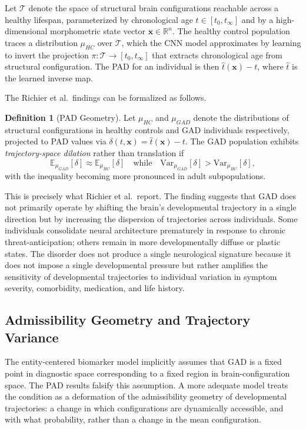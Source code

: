 \documentclass[11pt,a4paper]{article}
\theoremstyle{plain}
\theoremstyle{definition}
\newtheorem{definition}[theorem]{Definition}
\begin{document}
Let $\mathcal{T}$ denote the space of structural brain configurations reachable across
a healthy lifespan, parameterized by chronological age $t \in [t_0, t_\infty]$ and
by a high-dimensional morphometric state vector $\mathbf{x} \in \mathbb{R}^n$.
The healthy control population traces a distribution $\mu_{HC}$ over $\mathcal{T}$,
which the CNN model approximates by learning to invert the projection
$\pi: \mathcal{T} \to [t_0, t_\infty]$ that extracts chronological age from structural
configuration. The PAD for an individual is then $\hat{t}(\mathbf{x}) - t$,
where $\hat{t}$ is the learned inverse map.

The Richier et al.\ findings can be formalized as follows.

\begin{definition}[PAD Geometry]
Let $\mu_{HC}$ and $\mu_{GAD}$ denote the distributions of structural configurations
in healthy controls and GAD individuals respectively, projected to PAD values via
$\delta(t, \mathbf{x}) = \hat{t}(\mathbf{x}) - t$. The GAD population exhibits
\emph{trajectory-space dilation} rather than translation if
\[
\mathbb{E}_{\mu_{GAD}}[\delta] \approx \mathbb{E}_{\mu_{HC}}[\delta]
\quad \text{while} \quad
\mathrm{Var}_{\mu_{GAD}}[\delta] > \mathrm{Var}_{\mu_{HC}}[\delta],
\]
with the inequality becoming more pronounced in adult subpopulations.
\end{definition}

This is precisely what Richier et al.\ report. The finding suggests that GAD does not
primarily operate by shifting the brain's developmental trajectory in a single direction
but by increasing the dispersion of trajectories across individuals. Some individuals
consolidate neural architecture prematurely in response to chronic threat-anticipation;
others remain in more developmentally diffuse or plastic states. The disorder does not
produce a single neurological signature because it does not impose a single developmental
pressure but rather amplifies the sensitivity of developmental trajectories to individual
variation in symptom severity, comorbidity, medication, and life history.

\subsection{Admissibility Geometry and Trajectory Variance}

The entity-centered biomarker model implicitly assumes that GAD is a fixed point in
diagnostic space corresponding to a fixed region in brain-configuration space. The PAD
results falsify this assumption. A more adequate model treats the condition as a
deformation of the admissibility geometry of developmental trajectories: a change in
which configurations are dynamically accessible, and with what probability, rather than
a change in the mean configuration.
\end{document}
